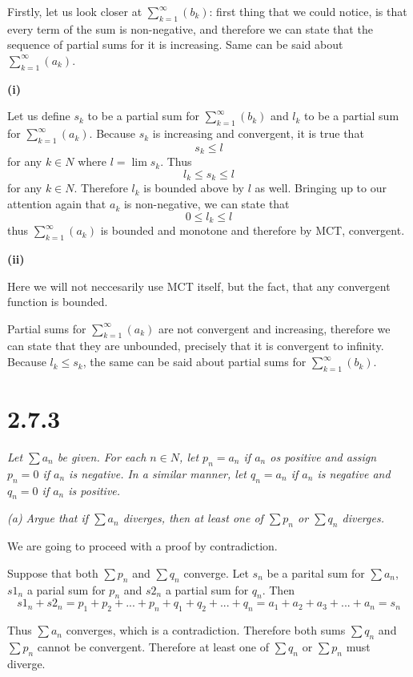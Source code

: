 \documentclass[11pt,oneside,titlepage]{article}
\begin{document}
Firstly, let us look closer at $\sum^{\infty}_{k = 1}(b_k)$: first
thing that we could
notice, is that every term of the sum is non-negative, and therefore
we can state that the sequence of partial sums for it  is increasing.
Same can be said about $\sum^{\infty}_{k = 1}(a_k)$.

\textbf{(i)}

Let us define  $s_k$ to be  a partial sum for
$\sum^{\infty}_{k = 1}(b_k)$ and $l_k$ to be a partial sum for
$\sum^{\infty}_{k = 1}(a_k)$. Because
$s_k$ is increasing and convergent, it is true that
$$s_k \leq l$$
for any $k \in N$ where $l = \lim s_k$. Thus
$$l_k \leq s_k \leq l$$
for any $k \in N$. Therefore $l_k$ is bounded above by $l$ as well.
Bringing up to our attention again that $a_k$ is non-negative, we can
state that
$$0 \leq l_k \leq l$$
thus $\sum^{\infty}_{k = 1}(a_k)$ is bounded and monotone and therefore by MCT,
convergent.

\textbf{(ii)}

Here we will not neccesarily use MCT itself, but the fact, that any convergent
function is bounded.

Partial sums for $\sum^{\infty}_{k = 1}(a_k)$ are not convergent and
increasing, therefore we can state that they are unbounded, precisely
that it is convergent to infinity. Because $l_k \leq s_k$, the same can be said
about partial sums for  $\sum^{\infty}_{k = 1}(b_k)$.

\section*{2.7.3}
\textit{Let $\sum a_n$ be given. For each $n \in N$, let $p_n = a_n$ if $a_n$
  os positive and assign $p_n = 0$ if $a_n$ is negative. In a similar manner,
  let $q_n = a_n$ if $a_n$ is negative and $q_n = 0$ if $a_n$ is positive. }

\textit{(a) Argue that if $\sum a_n$ diverges, then at least one of
  $\sum p_n$ or $\sum q_n$ diverges.}

We are going to proceed with a proof by contradiction.

Suppose that both $\sum p_n$ and  $\sum q_n$ converge. Let $s_n$ be
a parital sum for $\sum a_n$, $s1_n$ a parial sum for $p_n$ and $s2_n$ a
partial sum for $q_n$. Then
$$s1_n + s2_n = p_1 + p_2 + ... + p_n + q_1 + q_2 + ... + q_n =
a_1 + a_2 + a_3 + ... + a_n = s_n$$

Thus $\sum a_n$ converges, which is a contradiction. Therefore both
sums $\sum q_n$ and $\sum p_n$ cannot be convergent. Therefore at least one of
$\sum q_n$ or $\sum p_n$ must diverge.
\end{document}
